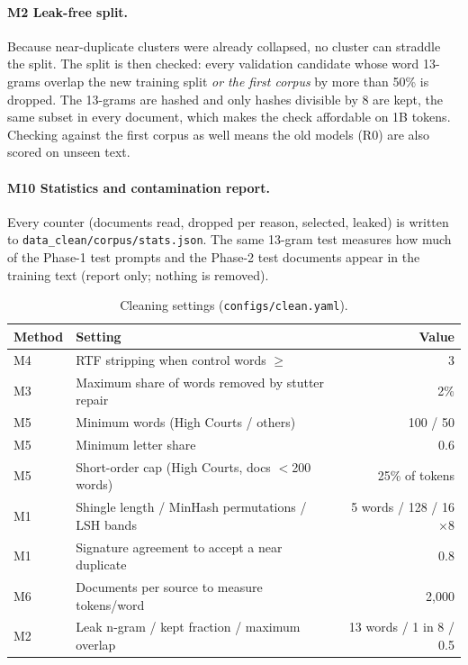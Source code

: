 \documentclass[11pt,a4paper]{article}
\newcommand{\code}[1]{\texttt{\small #1}}
\begin{document}
\paragraph{M2 Leak-free split.} Because near-duplicate clusters were already collapsed, no cluster can
straddle the split.  The split is then checked: every validation candidate whose word 13-grams overlap the
new training split \emph{or the first corpus} by more than 50\% is dropped.  The 13-grams are hashed and only
hashes divisible by 8 are kept, the same subset in every document, which makes the check affordable on 1B
tokens.  Checking against the first corpus as well means the old models (R0) are also scored on unseen text.

\paragraph{M10 Statistics and contamination report.} Every counter (documents read, dropped per reason,
selected, leaked) is written to \code{data\_clean/corpus/stats.json}.  The same 13-gram test measures how
much of the Phase-1 test prompts and the Phase-2 test documents appear in the training text (report only;
nothing is removed).

\begin{table}[H]\centering\small
\caption{Cleaning settings (\code{configs/clean.yaml}).}\label{tab:cleancfg}
\begin{tabular}{llr}\toprule
Method & Setting & Value\\\midrule
M4 & RTF stripping when control words $\ge$ & 3\\
M3 & Maximum share of words removed by stutter repair & 2\%\\
M5 & Minimum words (High Courts / others) & 100 / 50\\
M5 & Minimum letter share & 0.6\\
M5 & Short-order cap (High Courts, docs $<$200 words) & 25\% of tokens\\
M1 & Shingle length / MinHash permutations / LSH bands & 5 words / 128 / 16$\times$8\\
M1 & Signature agreement to accept a near duplicate & 0.8\\
M6 & Documents per source to measure tokens/word & 2{,}000\\
M2 & Leak n-gram / kept fraction / maximum overlap & 13 words / 1 in 8 / 0.5\\
\bottomrule\end{tabular}\end{table}
\end{document}

